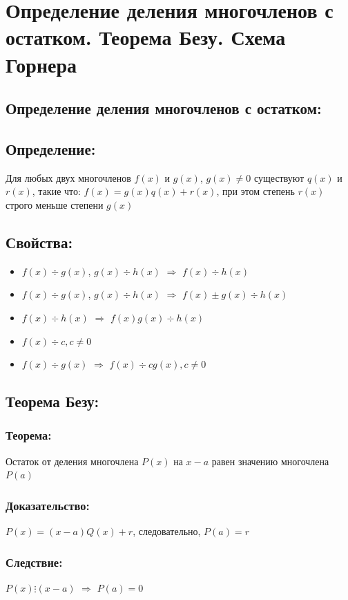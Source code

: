 \documentclass[12pt]{article}
\begin{document}
    \section{Определение деления многочленов с остатком. Теорема Безу. Схема Горнера}
    \subsection{Определение деления многочленов с остатком:}
    \subsection{Определение:}
    Для любых двух многочленов $f(x)$ и $g(x)$, $g(x)\neq {0}$ существуют $q(x)$ и $r(x)$, такие что: $f(x) = g(x)q(x) + r(x)$, при этом степень $r(x)$ строго меньше степени $g(x)$\par
    \subsection{Свойства:}
    \begin{itemize}
        \item $f(x) \div g(x)$, $g(x) \div h(x)$ $\Rightarrow$ $f(x) \div h(x)$
        \item $f(x) \div g(x)$, $g(x) \div h(x)$ $\Rightarrow$ $f(x){\pm}g(x) \div h(x)$
        \item $f(x) \div h(x)$ $\Rightarrow$ $f(x)g(x) \div h(x)$
        \item $f(x) \div c, c\neq{0}$
        \item $f(x) \div g(x)$ $\Rightarrow$ $f(x) \div cg(x), c\neq{0}$
    \end{itemize}
    \subsection{Теорема Безу:}
    \subsubsection{Теорема:}
    Остаток от деления многочлена $P(x)$ на $x-a$ равен значению многочлена $P(a)$
    \subsubsection{Доказательство:}
    $P(x) = (x − a)Q(x) + r$, следовательно, $P(a) = r$
    \subsubsection{Следствие:}
    $P(x) \vdots (x − a)$ $\Rightarrow$ $P(a) = 0$
\end{document}
